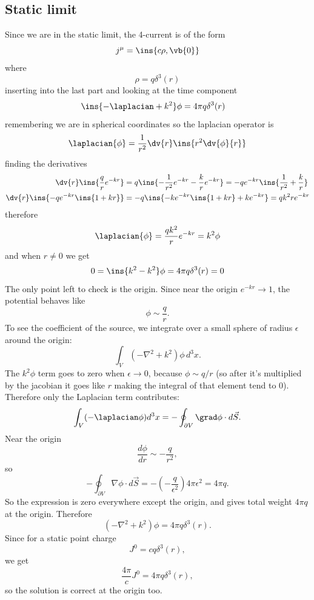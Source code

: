\subsection{Static limit}
Since we are in the static limit, the 4-current is of the form 
\begin{equation}
    j^\mu = \ins{c\rho,\vb{0}}
\end{equation}
where 
\begin{equation}
    \rho = q\delta^3(r)
\end{equation}
inserting into the last part and looking at the time component 
\begin{align}
    \ins{-\laplacian+k^2} \phi &= 4\pi q\delta^3(r)
\end{align}
remembering we are in spherical coordinates so the laplacian operator is 
\begin{equation}
    \laplacian{\phi} = \frac{1}{r^2}\dv{r}\ins{r^2\dv{\phi}{r}}
\end{equation}
finding the derivatives
\begin{align}
    \dv{r}\ins{\frac{q}{r}e^{-kr}} &= q\ins{-\frac{1}{r^2}e^{-kr}-\frac{k}{r}e^{-kr}} = -qe^{-kr}\ins{\frac{1}{r^2}+\frac{k}{r}}\\
    \dv{r}\ins{-qe^{-kr}\ins{1+kr}} &= -q\ins{-ke^{-kr}\ins{1+kr}+ke^{-kr}} = qk^2 re^{-kr}
\end{align}
therefore
\begin{equation}
    \laplacian{\phi} = \frac{qk^2}{r} e^{-kr} = k^2\phi
\end{equation}
and when \(r\neq0\) we get
\begin{equation}
    0 = \ins{k^2-k^2}\phi = 4\pi q\delta^3(r) = 0
\end{equation}
The only point left to check is the origin. Since near the origin \(e^{-kr}\rightarrow 1\), the potential behaves like
\[
\phi \sim \frac{q}{r}.
\]
To see the coefficient of the source, we integrate over a small sphere of radius \(\epsilon\) around the origin:
\[
\int_{V}(-\nabla^2+k^2)\phi\,d^3x.
\]
The \(k^2\phi\) term goes to zero when \(\epsilon\rightarrow0\), because \(\phi\sim q/r\) (so after it's multiplied by the jacobian it goes like \(r\) making the integral of that element tend to 0). Therefore only the Laplacian term contributes:
\[
\int_{V}(-\laplacian\phi)d^3x
=
-\oint_{\partial V}\grad\phi\cdot d\vec S.
\]
Near the origin
\[
\frac{d\phi}{dr}\sim-\frac{q}{r^2},
\]
so
\[
-\oint_{\partial V}\nabla\phi\cdot d\vec S
=
-\left(-\frac{q}{\epsilon^2}\right)4\pi\epsilon^2
=
4\pi q.
\]
So the expression is zero everywhere except the origin, and gives total weight \(4\pi q\) at the origin. Therefore
\[
(-\nabla^2+k^2)\phi=4\pi q\delta^3(r).
\]
Since for a static point charge
\[
J^0=cq\delta^3(r),
\]
we get
\[
\frac{4\pi}{c}J^0=4\pi q\delta^3(r),
\]
so the solution is correct at the origin too.